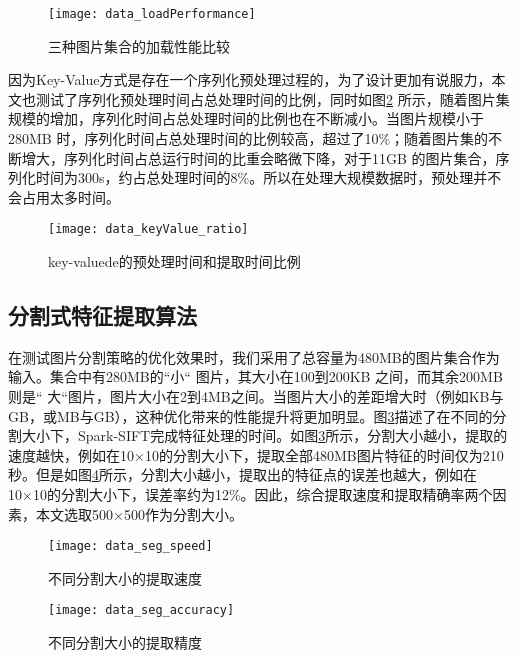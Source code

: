 \begin{figure}[htp]
\centering
\texttt{[image: data\_loadPerformance]}
\caption{三种图片集合的加载性能比较}
\label{fig:data_loadPerformance}
\end{figure}
因为Key-Value方式是存在一个序列化预处理过程的，为了设计更加有说服力，本文也测试了序列化预处理时间占总处理时间的比例，同时如图\ref{fig:data_keyValue_ratio} 所示，随着图片集规模的增加，序列化时间占总处理时间的比例也在不断减小。当图片规模小于280MB 时，序列化时间占总处理时间的比例较高，超过了10\%；随着图片集的不断增大，序列化时间占总运行时间的比重会略微下降，对于11GB 的图片集合，序列化时间为300s，约占总处理时间的8\%。所以在处理大规模数据时，预处理并不会占用太多时间。
\begin{figure}[htp]
\centering
\texttt{[image: data\_keyValue\_ratio]}
\caption{key-valuede的预处理时间和提取时间比例}
\label{fig:data_keyValue_ratio}
\end{figure}

\subsection{分割式特征提取算法}
在测试图片分割策略的优化效果时，我们采用了总容量为480MB的图片集合作为输入。集合中有280MB的``小`` 图片，其大小在100到200KB 之间，而其余200MB则是`` 大``图片，图片大小在2到4MB之间。当图片大小的差距增大时（例如KB与GB，或MB与GB），这种优化带来的性能提升将更加明显。图\ref{fig:data_seg_speed}描述了在不同的分割大小下，Spark-SIFT完成特征处理的时间。如图\ref{fig:data_seg_speed}所示，分割大小越小，提取的速度越快，例如在10×10的分割大小下，提取全部480MB图片特征的时间仅为210秒。但是如图\ref{fig:data_seg_accuracy}所示，分割大小越小，提取出的特征点的误差也越大，例如在10×10的分割大小下，误差率约为12\%。因此，综合提取速度和提取精确率两个因素，本文选取500×500作为分割大小。
\begin{figure}[htp]
\centering
\texttt{[image: data\_seg\_speed]}
\caption{不同分割大小的提取速度}
\label{fig:data_seg_speed}
\end{figure}

\begin{figure}[htp]
\centering
\texttt{[image: data\_seg\_accuracy]}
\caption{不同分割大小的提取精度}
\label{fig:data_seg_accuracy}
\end{figure}


